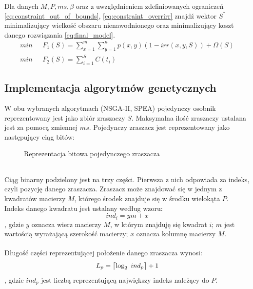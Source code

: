 \documentclass[twoside]{iisthesis}
\begin{document}
Dla danych $M, P, ms, \beta$ oraz z uwzględnieniem zdefiniowanych ograniczeń \eqref{eq:constraint_out_of_bounds}, \eqref{eq:constraint_overrirr} znajdź wektor $S^{*}$ minimalizujący wielkość obszaru nienawodnionego oraz minimalizujący koszt danego rozwiązania \eqref{eq:final_model}.
\begin{equation}\label{eq:final_model}
	\begin{split}
		min \text{  }&  F_{1}(S) = \sum_{x=1}^{m}\sum_{y=1}^{n} p(x,y) (1 - irr(x,y,S)) + \Omega(S)\\
		min \text{  }&	F_{2}(S) = \sum_{i=1}^{S} C(t_{i})
	\end{split}
\end{equation}

\subsection{Implementacja algorytmów genetycznych}
W obu wybranych algorytmach (NSGA-II, SPEA) pojedynczy osobnik reprezentowany jest jako zbiór zraszaczy $S$. Maksymalna ilość zraszaczy ustalana jest za pomocą zmiennej $ms$. Pojedynczy zraszacz jest reprezentowany jako następujący ciąg bitów:
\begin{figure}[!htb]
	\centering
	\caption{Reprezentacja bitowa pojedynczego zraszacza}
	\label{fig:sprinkler_bin_repr}
\end{figure}
\\Ciąg binarny podzielony jest na trzy części. Pierwsza z nich odpowiada za indeks, czyli pozycję danego zraszacza. Zraszacz może znajdować się w jednym z kwadratów macierzy $M$, którego środek znajduje się w środku wielokąta $P$. Indeks danego kwadratu jest ustalany według wzoru:
\begin{equation}
	ind_{i} = y m + x
\end{equation}
, gdzie $y$ oznacza wierz macierzy $M$, w którym znajduję się kwadrat $i$; $m$ jest wartością wyrażającą szerokość macierzy; $x$ oznacza kolumnę macierzy $M$.\\\\
Długość części reprezentującej położenie danego zraszacza wynosi:
\DeclarePairedDelimiter{\ceil}{\lceil}{\rceil}
\begin{equation}
	L_{p} = \ceil[\big]{\log_{2} \text{ } ind_{p}} + 1
\end{equation}
, gdzie $ind_p$ jest liczbą reprezentującą największy indeks należący do $P$.
\end{document}
